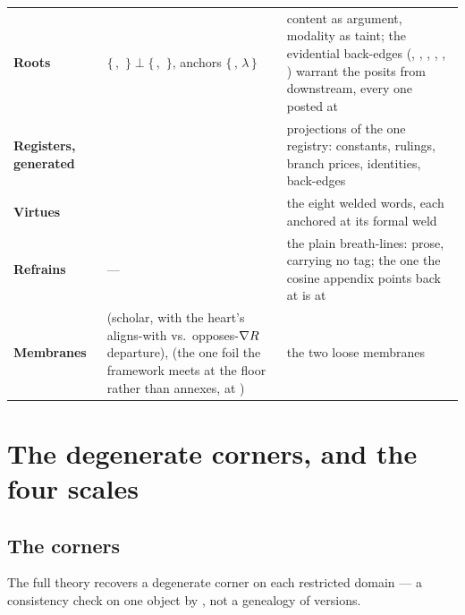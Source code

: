 \documentclass[../main]{subfiles}
\begin{document}
\begin{xltabular}{\textwidth}{@{}
    >{\bfseries\RaggedRight}p{0.14\textwidth}
    >{\hsize}L
    >{\hsize}L @{}}
  \addlinespace
  Roots & $\{\,$, $\,\}\perp\{\,$,
    $\,\}$, anchors $\{\,$, $\lambda\,\}$
    & content as argument, modality as taint; the evidential back-edges
      (, , ,
      ,
      , ) warrant the
      posits from downstream, every one posted at  \\
  \addlinespace
  Registers, generated & 
    & projections of the one registry: constants, rulings, branch prices, identities,
      back-edges \\
  \addlinespace
  Virtues & 
    & the eight welded words, each anchored at its formal weld \\
  \addlinespace
  Refrains & ---
    & the plain breath-lines: prose, carrying no tag; the one the cosine
      appendix points back at is at  \\
  \addlinespace
  Membranes &  (scholar, with  the heart's aligns-with vs.\
    opposes-$\nabla R$ departure),  (the one foil the framework
    meets at the floor rather than annexes, at \ftag*{op:recess})
    & the two loose membranes \\
\end{xltabular}

\clearpage
\section{The degenerate corners, and the four scales}
\label{app:corners}

\subsection{The corners}
\label{subsec:corners:corners}
The full theory recovers a degenerate corner on each restricted domain --- a consistency
check on one object by \ftag{g:rec}, not a genealogy of versions.
\end{document}
